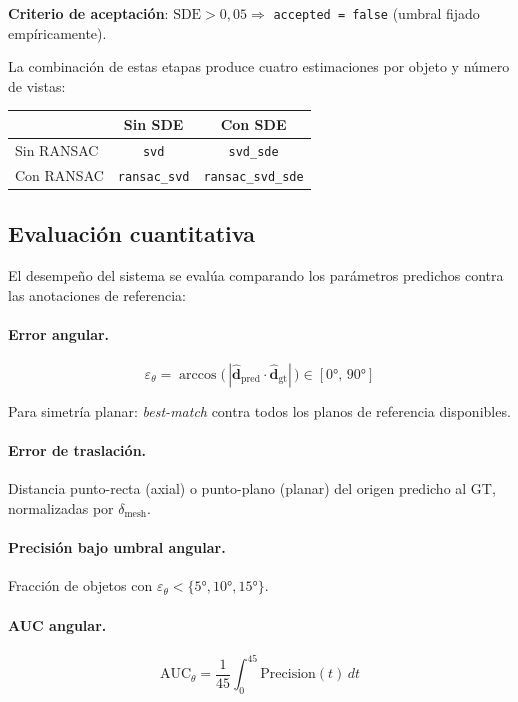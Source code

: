 \textbf{Criterio de aceptación}: $\text{SDE} > 0{,}05 \Rightarrow$
\texttt{accepted = false} (umbral fijado empíricamente).

La combinación de estas etapas produce cuatro estimaciones por objeto y número
de vistas:

\begin{center}
\begin{tabular}{lcc}
\toprule
 & Sin SDE & Con SDE \\
\midrule
Sin RANSAC & \texttt{svd} & \texttt{svd\_sde} \\
Con RANSAC & \texttt{ransac\_svd} & \texttt{ransac\_svd\_sde} \\
\bottomrule
\end{tabular}
\end{center}

\newpage
\subsection{Evaluación cuantitativa}

El desempeño del sistema se evalúa comparando los parámetros predichos contra las
anotaciones de referencia:

\paragraph{Error angular.}
\begin{equation}
    \varepsilon_\theta = \arccos\!\bigl(\,|\hat{\mathbf{d}}_{\text{pred}}
        \cdot \hat{\mathbf{d}}_{\text{gt}}|\,\bigr) \in [0°,\,90°]
\end{equation}

Para simetría planar: \textit{best-match} contra todos los planos de referencia
disponibles.

\paragraph{Error de traslación.}
Distancia punto-recta (axial) o punto-plano (planar) del origen predicho al GT,
normalizadas por $\delta_{\text{mesh}}$.

\paragraph{Precisión bajo umbral angular.}
Fracción de objetos con $\varepsilon_\theta < \{5°, 10°, 15°\}$.

\paragraph{AUC angular.}
\begin{equation}
    \text{AUC}_\theta =
    \frac{1}{45}\int_0^{45}\text{Precision}(t)\,dt
\end{equation}

